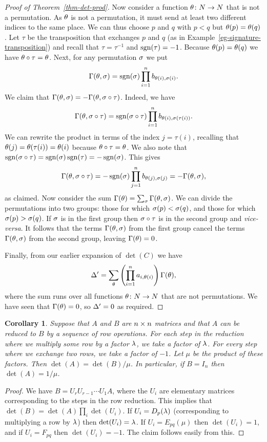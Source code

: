 \documentclass[reqno]{amsart}
\newtheorem{corollary}[theorem]{Corollary}
\theoremstyle{definition}
\begin{document}
\begin{proof}[Proof of Theorem~\ref{thm-det-prod}]
 Now consider a function $\theta\colon N\to N$ that is not a permutation.  As
 $\theta$ is not a permutation, it must send at least two different
 indices to the same place.  We can thus choose $p$ and $q$ with $p<q$
 but $\theta(p)=\theta(q)$.  Let $\tau$ be the transposition that
 exchanges $p$ and $q$ (as in
 Example~\ref{eg-signature-transposition}) and recall that
 $\tau=\tau^{-1}$ and $\operatorname{sgn}(\tau)=-1$.  Because $\theta(p)=\theta(q)$ we
 have $\theta\circ\tau=\theta$.  Next, for any permutation $\sigma$ we put
 \[ \Gamma(\theta,\sigma) = \operatorname{sgn}(\sigma)\prod_{i=1}^n b_{\theta(i),\sigma(i)}. \]
 We claim that $\Gamma(\theta,\sigma)=-\Gamma(\theta,\sigma\circ\tau)$.  Indeed, we
 have
 \[ \Gamma(\theta,\sigma\circ\tau) =
     \operatorname{sgn}(\sigma\circ\tau)\prod_{i=1}^n b_{\theta(i),\sigma(\tau(i))}.
 \]
 We can rewrite the product in terms of the index $j=\tau(i)$,
 recalling that $\theta(j)=\theta(\tau(i))=\theta(i)$ because
 $\theta \circ \tau = \theta$.  We also note that
 $\operatorname{sgn}(\sigma\circ\tau)=\operatorname{sgn}(\sigma)\operatorname{sgn}(\tau)=-\operatorname{sgn}(\sigma)$.  This gives
 \[ \Gamma(\theta,\sigma\circ\tau) =
     -\operatorname{sgn}(\sigma)\prod_{j=1}^n b_{\theta(j),\sigma(j)} = -\Gamma(\theta,\sigma),
 \]
 as claimed.  Now consider the sum $\Gamma(\theta)=\sum_\sigma\Gamma(\theta,\sigma)$.
 We can divide the permutations into two groups: those for which
 $\sigma(p)<\sigma(q)$, and those for which $\sigma(p)>\sigma(q)$.  If $\sigma$ is in
 the first group then $\sigma\circ\tau$ is in the second group and
 \emph{vice-versa}.  It follows that the terms $\Gamma(\theta,\sigma)$ from
 the first group cancel the terms $\Gamma(\theta,\sigma)$ from the second
 group, leaving $\Gamma(\theta)=0$.

 Finally, from our earlier expansion of $\det(C)$ we have
 \[ \Delta' =
     \sum_\theta \left(\prod_{i=1}^na_{i,\theta(i)}\right) \Gamma(\theta),
 \]
 where the sum runs over all functions $\theta\colon N\to N$ that are not
 permutations.  We have seen that $\Gamma(\theta)=0$, so $\Delta'=0$ as
 required.
\end{proof}

\begin{corollary}\label{cor-det-row-ops}
 Suppose that $A$ and $B$ are $n\times n$ matrices and that $A$ can be
 reduced to $B$ by a sequence of row operations.  For each step in the
 reduction where we multiply some row by a factor $\lambda$, we take a
 factor of $\lambda$.  For every step where we exchange two rows, we take
 a factor of $-1$.  Let $\mu$ be the product of these factors.  Then
 $\det(A)=\det(B)/\mu$.  In particular, if $B=I_n$ then
 $\det(A)=1/\mu$.
\end{corollary}
\begin{proof}
 We have $B=U_rU_{r-1}\dotsb U_1A$, where the $U_i$ are elementary
 matrices corresponding to the steps in the row reduction.  This
 implies that $\det(B)=\det(A)\prod_i\det(U_i)$.  If $U_i=D_p(\lambda)$
 (corresponding to multiplying a row by $\lambda$) then $\det(U_i)=\lambda$.
 If $U_i=E_{pq}(\mu)$ then $\det(U_i)=1$, and if $U_i=F_{pq}$ then
 $\det(U_i)=-1$.  The claim follows easily from this.
\end{proof}
\end{document}
